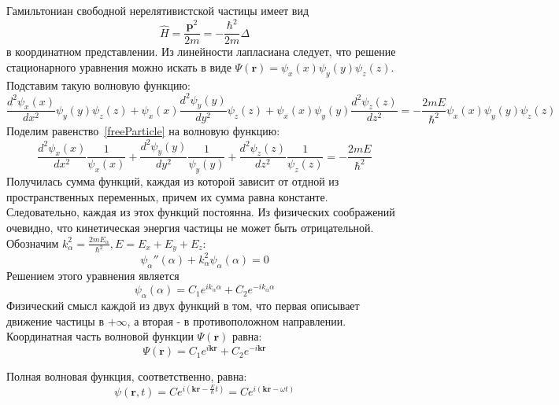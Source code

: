 \documentclass{article}
\begin{document}
\begin{enumerate}
	Гамильтониан свободной нерелятивистской частицы имеет вид
	\begin{equation}
		\hat{H} = \frac{\textbf{p}^2}{2m} = -\frac{\hbar^2}{2m} \Delta
	\end{equation}
	в координатном представлении. Из линейности лапласиана следует, что решение стационарного уравнения можно искать в виде $\Psi(\textbf{r}) = \psi_x(x) \psi_y(y) \psi_z(z)$. Подставим такую волновую функцию:
	\begin{equation}
		\frac{d^2 \psi_x(x)}{d x^2}\psi_y(y)\psi_z(z) + \psi_x(x)\frac{d^2 \psi_y(y)}{d y^2}\psi_z(z) + \psi_x(x)\psi_y(y)\frac{d^2 \psi_z(z)}{d z^2} = -\frac{2mE}{\hbar^2} \psi_x(x)\psi_y(y)\psi_z(z) \label{freeParticle}
	\end{equation}
	Поделим равенство~\eqref{freeParticle} на волновую функцию:
	\begin{equation}
		\frac{d^2 \psi_x(x)}{d x^2} \frac{1}{\psi_x(x)} + \frac{d^2 \psi_y(y)}{d y^2} \frac{1}{\psi_y(y)} + \frac{d^2 \psi_z(z)}{d z^2} \frac{1}{\psi_z(z)} = -\frac{2mE}{\hbar^2}
	\end{equation}
	Получилась сумма функций, каждая из которой зависит от отдной из пространственных переменных, причем их сумма равна константе. Следовательно, каждая из этох функций постоянна. Из физических соображений очевидно, что кинетическая энергия частицы не может быть отрицательной. Обозначим $k_\alpha^2 =\frac{2m E_\alpha}{\hbar^2}, E = E_x + E_y + E_z$:
	\begin{equation}
		\psi_\alpha''(\alpha) + k^2_\alpha \psi_\alpha(\alpha) = 0
	\end{equation}
	Решением этого уравнения является
	\begin{equation}
		\psi_\alpha(\alpha) = C_1 e^{i k_\alpha \alpha} + C_2 e^{-i k_\alpha \alpha}
	\end{equation}
	Физический смысл каждой из двух функций в том, что первая описывает движение частицы в $+\infty$, а вторая - в противоположном направлении. Координатная часть волновой функции $\Psi(\textbf{r})$ равна:
	\begin{equation}
		\Psi(\textbf{r}) = C_1 e^{i\textbf{kr}} + C_2 e^{-i\textbf{kr}}
	\end{equation}
	
	Полная волновая функция, соответственно, равна:
	\begin{equation}
		\psi(\textbf{r},t) = C e^{i(\textbf{kr} - \frac{E}{\hbar}t)} = C e^{i(\textbf{kr} - \omega t)}
	\end{equation}
	

\end{enumerate}
\end{document}
